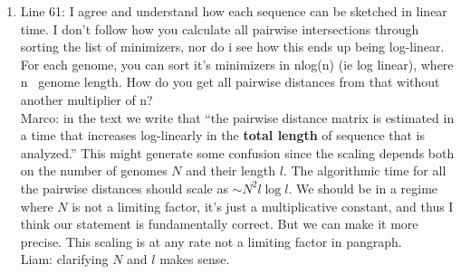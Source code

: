 \documentclass[aps,rmp,onecolumn]{revtex4-1}
\newcommand{\Marco}[1]{{\color{gray}Marco: #1}}
\newcommand{\Liam}[1]{{\color{teal}Liam: #1}}
\begin{document}
\begin{enumerate}
      \item Line 61: I agree and understand how each sequence can be sketched in linear time. I don't follow how you calculate all pairwise intersections through sorting the list of minimizers, nor do i see how this ends up being log-linear. For each genome, you can sort it's minimizers in nlog(n) (ie log linear), where n ~genome length. How do you get all pairwise distances from that without another multiplier of n?\\
            \Marco{in the text we write that ``the pairwise distance matrix is estimated in a time that increases log-linearly in the \textbf{total length} of sequence that is analyzed.'' This might generate some confusion since the scaling depends both on the number of genomes $N$ and their length $l$. The algorithmic time for all the pairwise distances should scale as $\sim N^2 l \log l$. We should be in a regime where $N$ is not a limiting factor, it's just a multiplicative constant, and thus I think our statement is fundamentally correct. But we can make it more precise. This scaling is at any rate not a limiting factor in pangraph.}\\
            \Liam{clarifying $N$ and $l$ makes sense.}


\end{enumerate}
\end{document}
